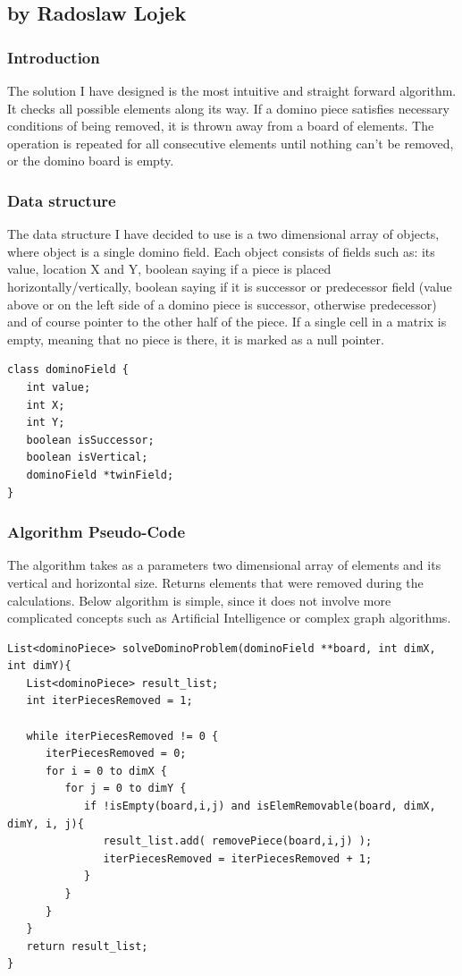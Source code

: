 \subsection{by Radoslaw Lojek}

\subsubsection{Introduction}
The solution I have designed is the most intuitive and straight forward algorithm. It checks all
possible elements along its way. If a domino piece satisfies necessary conditions of being removed,
it is thrown away from a board of elements. The operation is repeated for all consecutive elements
until nothing can't be removed, or the domino board is empty.

\subsubsection{Data structure}
The data structure I have decided to use is a two dimensional array of objects, where object is a
single domino field. Each object consists of fields such as: its value, location X and Y, boolean
saying if a piece is placed horizontally/vertically, boolean saying if it is successor or
predecessor field (value above or on the left side of a domino piece is successor, otherwise
predecessor) and of course pointer to the other half of the piece. If a single cell in a matrix is
empty, meaning that no piece is there, it is marked as a null pointer.
\\
\begin{verbatim}
class dominoField {
   int value;
   int X;
   int Y; 
   boolean isSuccessor;
   boolean isVertical; 
   dominoField *twinField; 
}
\end{verbatim}


\subsubsection{Algorithm Pseudo-Code}
The algorithm takes as a parameters two dimensional array of elements and its vertical and
horizontal size. Returns elements that were removed during the calculations. Below algorithm is
simple, since it does not involve more complicated concepts such as Artificial Intelligence or
complex graph algorithms.
\\
\begin{verbatim}
List<dominoPiece> solveDominoProblem(dominoField **board, int dimX, int dimY){
   List<dominoPiece> result_list;
   int iterPiecesRemoved = 1;
   
   while iterPiecesRemoved != 0 {
      iterPiecesRemoved = 0;
      for i = 0 to dimX {
         for j = 0 to dimY {
            if !isEmpty(board,i,j) and isElemRemovable(board, dimX, dimY, i, j){ 
               result_list.add( removePiece(board,i,j) );
               iterPiecesRemoved = iterPiecesRemoved + 1;
            }
         }
      }
   }
   return result_list;
}
\end{verbatim}

